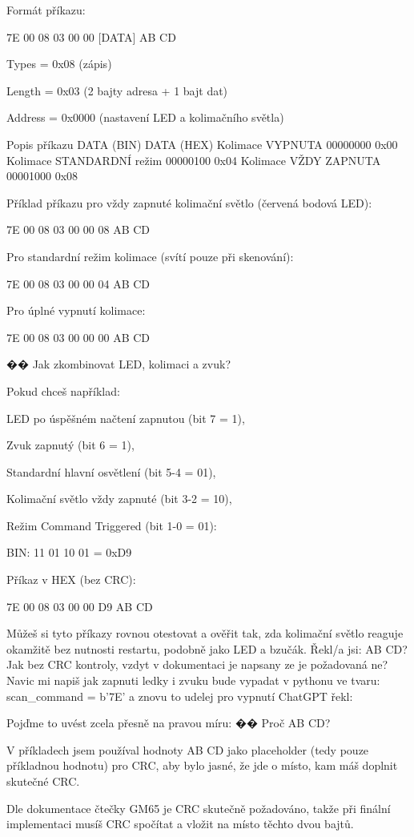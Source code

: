 Formát příkazu:

7E 00 08 03 00 00 [DATA] AB CD

    Types = 0x08 (zápis)

    Length = 0x03 (2 bajty adresa + 1 bajt dat)

    Address = 0x0000 (nastavení LED a kolimačního světla)

Popis příkazu	DATA (BIN)	DATA (HEX)
Kolimace VYPNUTA	00000000	0x00
Kolimace STANDARDNÍ režim	00000100	0x04
Kolimace VŽDY ZAPNUTA	00001000	0x08

Příklad příkazu pro vždy zapnuté kolimační světlo (červená bodová LED):

7E 00 08 03 00 00 08 AB CD

Pro standardní režim kolimace (svítí pouze při skenování):

7E 00 08 03 00 00 04 AB CD

Pro úplné vypnutí kolimace:

7E 00 08 03 00 00 00 AB CD

�� Jak zkombinovat LED, kolimaci a zvuk?

Pokud chceš například:

    LED po úspěšném načtení zapnutou (bit 7 = 1),

    Zvuk zapnutý (bit 6 = 1),

    Standardní hlavní osvětlení (bit 5-4 = 01),

    Kolimační světlo vždy zapnuté (bit 3-2 = 10),

    Režim Command Triggered (bit 1-0 = 01):

BIN: 11 01 10 01 = 0xD9

Příkaz v HEX (bez CRC):

7E 00 08 03 00 00 D9 AB CD

Můžeš si tyto příkazy rovnou otestovat a ověřit tak, zda kolimační světlo reaguje okamžitě bez nutnosti restartu, podobně jako LED a bzučák.
Řekl/a jsi:
AB CD? Jak bez CRC kontroly, vzdyt v dokumentaci je napsany ze je požadovaná ne? Navic mi napiš jak zapnuti ledky i zvuku bude vypadat v pythonu ve tvaru: scan_command = b'\x7E\xAB\xCD'
a znovu to udelej pro vypnutí
ChatGPT řekl:

Pojďme to uvést zcela přesně na pravou míru:
�� Proč AB CD?

    V příkladech jsem používal hodnoty AB CD jako placeholder (tedy pouze příkladnou hodnotu) pro CRC, aby bylo jasné, že jde o místo, kam máš doplnit skutečné CRC.

    Dle dokumentace čtečky GM65 je CRC skutečně požadováno, takže při finální implementaci musíš CRC spočítat a vložit na místo těchto dvou bajtů.

